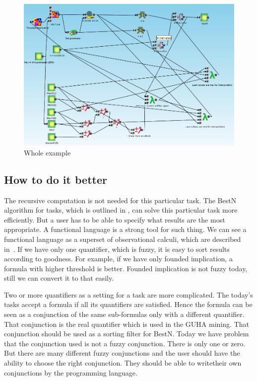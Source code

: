 \documentclass[a4paper,12pt]{book}
\begin{document}
\begin{figure}
	\includegraphics[width=1\textwidth]{exampleResult}
	\caption{Whole example}
	\label{fig:exampleResult}
\end{figure}


\subsection{How to do it better}
The recursive computation is not needed for this particular task. The BestN algorithm for tasks, which is outlined in \cite{thesisKuchar}, can solve this particular task more efficiently. But a user has to be able to specify what results are the most appropriate. A functional language is a strong tool for such thing. We can see a functional language as a superset of observational calculi, which are described in~\cite{GUHAbook}. If we have only one quantifier, which is fuzzy, it is easy to sort results according to goodness. For example, if we have only founded implication, a formula with higher threshold is better. Founded implication is not fuzzy today, still we can convert it to that easily.

Two or more quantifiers as a setting for a task are more complicated. The today's tasks accept a formula if all its quantifiers are satisfied. Hence the formula can be seen as a conjunction of the same sub-formulas only with a different quantifier. That conjunction is the real quantifier which is used in the GUHA mining. That conjunction should be used as a sorting filter for BestN. Today we have problem that the conjunction used is not a fuzzy conjunction. There is only one or zero. But there are many different fuzzy conjunctions and the user should have the ability to choose the right conjunction. They should be able to writetheir own conjunctions by the programming language.
\end{document}

